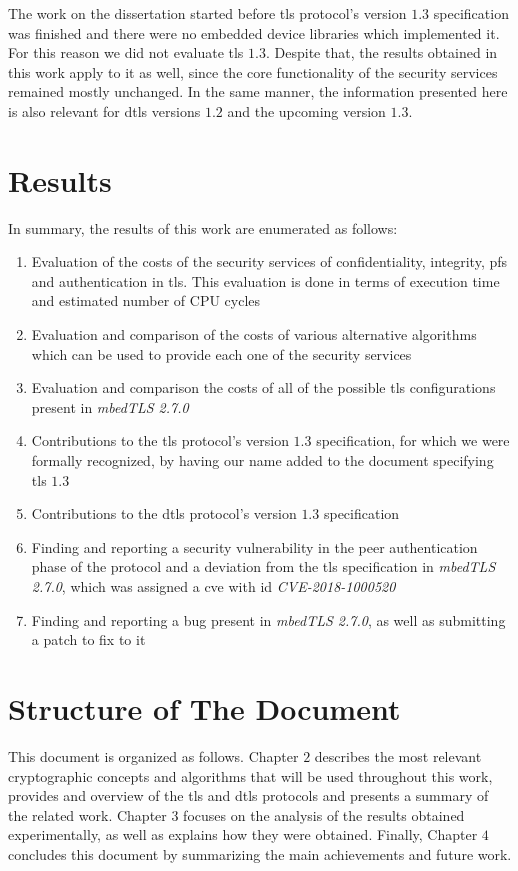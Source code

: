 The work on
the dissertation started before \gls{tls} protocol's version $1.3$ specification was finished and there were no embedded device
libraries which implemented it.  For this reason we did not evaluate \gls{tls} $1.3$. Despite that, the results
obtained in this work apply to it as well, since the core functionality of the security services remained mostly unchanged.
In the same manner, the information presented here is also relevant for \gls{dtls} versions $1.2$ and the upcoming version $1.3$.

\section{Results}

In summary, the results of this work are enumerated as follows:

\begin{enumerate}
  \item Evaluation of the costs of the security services of confidentiality, integrity, \gls{pfs} and authentication in \gls{tls}. This evaluation 
  is done in terms of execution time and estimated number of CPU cycles
  \item Evaluation and comparison of the costs of various alternative algorithms which can be used to provide each one of the security services
  \item Evaluation and comparison the costs of all of the possible \gls{tls} configurations present in \textit{mbedTLS 2.7.0}
  \item Contributions to the \gls{tls} protocol's version $1.3$ specification, for which we were formally recognized, by having our name added to the document specifying \gls{tls} $1.3$\cite{RFC8446}
  \item Contributions to the \gls{dtls} protocol's version $1.3$ specification\cite{DTLS13:online}
  \item Finding and reporting a security vulnerability in the peer authentication phase of the protocol and a deviation from the \gls{tls} specification in \textit{mbedTLS 2.7.0}, which was assigned a \gls{cve} with id \textit{CVE-2018-1000520}\cite{NVDCVE2094:online}
  \item Finding and reporting a bug present in \textit{mbedTLS 2.7.0}, as well as submitting a patch to fix to it \cite{sslserve89:onelin}\cite{updatete23:online}
\end{enumerate}

\section{Structure of The Document}

This document is organized as follows. Chapter $2$ describes the most relevant cryptographic concepts and algorithms
that will be used throughout this work, provides and overview of the \gls{tls} and \gls{dtls} protocols 
and presents a summary of the related work. Chapter $3$ focuses on the analysis of the results obtained experimentally,
as well as explains how they were obtained. Finally, Chapter $4$ concludes this document by summarizing the main achievements
and future work.